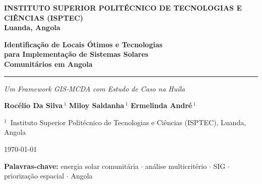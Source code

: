 \documentclass[12pt, a4paper]{article}
\begin{document}
\begin{titlepage}
  \begin{center}
    \noindent\colorbox{PrimaryBlue}{%
      \parbox{\dimexpr\linewidth+0pt\relax}{%
        \vspace{8pt}
        \centering
        \color{white}\small\bfseries
        INSTITUTO SUPERIOR POLITÉCNICO DE TECNOLOGIAS E CIÊNCIAS (ISPTEC)\\
        Luanda, Angola
        \vspace{8pt}
      }%
    }

    \vspace{2.5cm}

    {\LARGE\bfseries\color{PrimaryBlue}
      Identificação de Locais Ótimos e Tecnologias\\[6pt]
      para Implementação de Sistemas Solares\\[6pt]
      Comunitários em Angola}

    \vspace{0.6cm}
    {\large\color{AccentOrange}\rule{8cm}{1.5pt}}
    \vspace{0.4cm}

    {\large\itshape\color{MidGray}
      Um Framework GIS‑MCDA com Estudo de Caso na Huíla}

    \vspace{2cm}

    {\normalsize
      \textbf{Rocélio Da Silva}\,$^{1}$\quad
      \textbf{Miloy Saldanha}\,$^{1}$\quad
      \textbf{Ermelinda André}\,$^{1}$
    }

    \vspace{0.4cm}
    {\small\color{MidGray}
      $^{1}$~Instituto Superior Politécnico de Tecnologias e Ciências (ISPTEC), Luanda, Angola
    }

    \vfill

    {\small\color{MidGray}\today}

    \vspace{1cm}
    \noindent\colorbox{PrimaryBlue!15}{%
      \parbox{\dimexpr\linewidth\relax}{%
        \vspace{6pt}\centering
        {\small\color{PrimaryBlue}
          \textbf{Palavras-chave:} energia solar comunitária $\cdot$ análise multicritério $\cdot$
          SIG $\cdot$ priorização espacial $\cdot$ Angola}
        \vspace{6pt}
      }%
    }
  \end{center}
  \restoregeometry
\end{titlepage}
\end{document}

